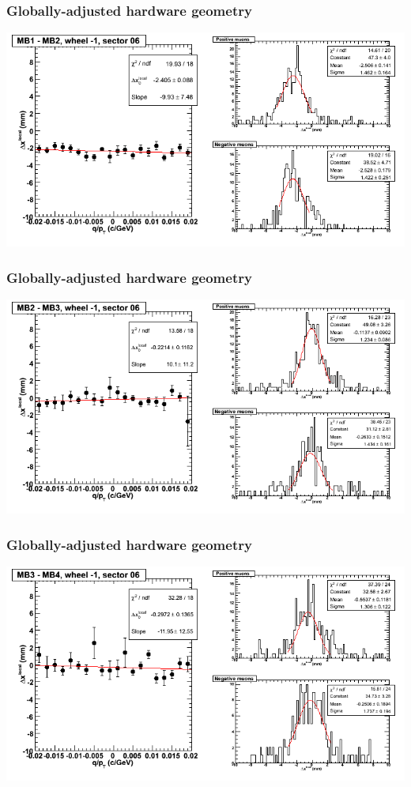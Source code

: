 \documentclass[compress]{beamer}
\begin{document}
\begin{frame}
\frametitle{Globally-adjusted hardware geometry}
\includegraphics[width=\linewidth]{NOV4_segdiffs_HW/dt13_resid_B_06_12.png}
\end{frame}

\begin{frame}
\frametitle{Globally-adjusted hardware geometry}
\includegraphics[width=\linewidth]{NOV4_segdiffs_HW/dt13_resid_B_06_23.png}
\end{frame}

\begin{frame}
\frametitle{Globally-adjusted hardware geometry}
\includegraphics[width=\linewidth]{NOV4_segdiffs_HW/dt13_resid_B_06_34.png}
\end{frame}
\end{document}

